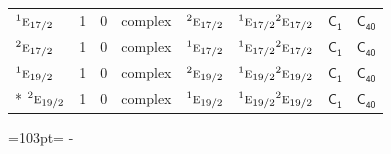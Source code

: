 \documentclass[10pt,a4paper]{article}
\newcommand{\needspace}[1]{\par\penalty-100\begingroup\dimen0=#1\relax\dimen2=\pagegoal
  \advance\dimen2-\pagetotal\ifdim\dimen0>\dimen2\relax\ifdim\dimen2>0pt\vfil\break\fi\fi
  \endgroup}
\numberwithin{equation}{section}
\newcommand{\grp}[1]{\mathsf{#1}}
\newcommand{\irr}[1]{\text{\normalfont\scshape #1}}
\newcommand{\conjpair}[1]{{}^{#1}}
\begin{document}
{\begin{longtable}{@{}lrrlllll@{}}
$\conjpair{1}\irr{e}_{17/2}$ & 1 & $0$ & complex & $\conjpair{2}\irr{e}_{17/2}$ & $\conjpair{1}\irr{e}_{17/2}\conjpair{2}\irr{e}_{17/2}$ & \href{C1.pdf}{$\grp{C_{1}}$} & $\grp{C_{40}}$\\
$\conjpair{2}\irr{e}_{17/2}$ & 1 & $0$ & complex & $\conjpair{1}\irr{e}_{17/2}$ & $\conjpair{1}\irr{e}_{17/2}\conjpair{2}\irr{e}_{17/2}$ & \href{C1.pdf}{$\grp{C_{1}}$} & $\grp{C_{40}}$\\
$\conjpair{1}\irr{e}_{19/2}$ & 1 & $0$ & complex & $\conjpair{2}\irr{e}_{19/2}$ & $\conjpair{1}\irr{e}_{19/2}\conjpair{2}\irr{e}_{19/2}$ & \href{C1.pdf}{$\grp{C_{1}}$} & $\grp{C_{40}}$\\*
$\conjpair{2}\irr{e}_{19/2}$ & 1 & $0$ & complex & $\conjpair{1}\irr{e}_{19/2}$ & $\conjpair{1}\irr{e}_{19/2}\conjpair{2}\irr{e}_{19/2}$ & \href{C1.pdf}{$\grp{C_{1}}$} & $\grp{C_{40}}$\\
\bottomrule\end{longtable}}
\needspace{103pt}
\end{document}
